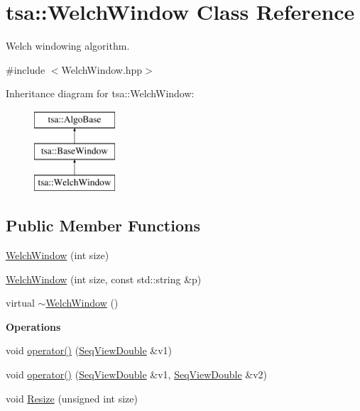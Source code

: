 \hypertarget{classtsa_1_1_welch_window}{}\section{tsa\+:\+:Welch\+Window Class Reference}
\label{classtsa_1_1_welch_window}


Welch windowing algorithm.  




{\ttfamily \#include $<$Welch\+Window.\+hpp$>$}

Inheritance diagram for tsa\+:\+:Welch\+Window\+:\begin{figure}[H]
\begin{center}
\leavevmode
\includegraphics[height=3.000000cm]{classtsa_1_1_welch_window}
\end{center}
\end{figure}
\subsection*{Public Member Functions}
\begin{DoxyCompactItemize}
\item 
\hyperlink{classtsa_1_1_welch_window_a81dc23dff14e460bd12c738ac8d92f5e}{Welch\+Window} (int size)
\item 
\hyperlink{classtsa_1_1_welch_window_a2ca3b163864f922f0c31196a772e6d03}{Welch\+Window} (int size, const std\+::string \&p)
\item 
virtual \hyperlink{classtsa_1_1_welch_window_a19fa30d5b4d564780e748464e0bcc245}{$\sim$\+Welch\+Window} ()
\end{DoxyCompactItemize}
\begin{Indent}\textbf{ Operations}\par
\begin{DoxyCompactItemize}
\item 
void \hyperlink{classtsa_1_1_welch_window_a4a3b7999c9d75b916d682dc0f94c87db}{operator()} (\hyperlink{namespacetsa_ac599574bcc094eda25613724b8f3ca9e}{Seq\+View\+Double} \&v1)
\item 
void \hyperlink{classtsa_1_1_welch_window_af6d14e181526f94d8ad6f1a2176db98a}{operator()} (\hyperlink{namespacetsa_ac599574bcc094eda25613724b8f3ca9e}{Seq\+View\+Double} \&v1, \hyperlink{namespacetsa_ac599574bcc094eda25613724b8f3ca9e}{Seq\+View\+Double} \&v2)
\item 
void \hyperlink{classtsa_1_1_welch_window_a5ad861714524733e648660d817e219d6}{Resize} (unsigned int size)
\end{DoxyCompactItemize}
\end{Indent}
